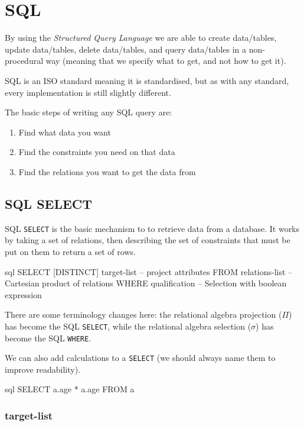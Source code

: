 \section{SQL}\label{sec:sql}

By using the \emph{Structured Query Language} we are able to create data/tables, update data/tables, delete data/tables, and query data/tables in a non-procedural way (meaning that we specify what to get, and not how to get it).

SQL is an ISO standard meaning it is standardised, but as with any standard, every implementation is still slightly different.

The basic steps of writing any SQL query are:
\begin{enumerate}
    \item Find what data you want
    \item Find the constraints you need on that data
    \item Find the relations you want to get the data from
\end{enumerate}

\subsection{SQL SELECT}\label{sub:sql_select}

SQL \texttt{SELECT} is the basic mechanism to to retrieve data from a database.
It works by taking a set of relations, then describing the set of constraints that must be put on them to return a set of rows.
\begin{code}{sql}
    SELECT [DISTINCT] target-list -- project attributes
    FROM relations-list -- Cartesian product of relations
    WHERE qualification  -- Selection with boolean expression
\end{code}
\begin{note}
    There are some terminology changes here: the relational algebra projection (\(\Pi\)) has become the SQL \texttt{SELECT}, while the relational algebra selection (\(\sigma\)) has become the SQL \texttt{WHERE}.
\end{note}
We can also add calculations to a \texttt{SELECT} (we should always name them to improve readability).
\begin{code}{sql}
    SELECT a.age * a.age FROM a
\end{code}

\subsubsection{target-list}\label{ssub:target_list}

